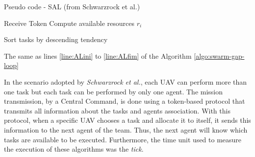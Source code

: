 \begin{algorithm}[h!t]
	\caption{Pseudo code - SAL (from Schwarzrock et al.\cite{MAS07})}
	\label{algo:swarm-gap2}
	
	\SetAlgoLined
	\DontPrintSemicolon
	
	\SetNlSkip{0.3em}
	
	Receive Token\;
	Compute available resources $r_i $ \; \label{line:compute_rALA}
	
	Sort tasks by descending tendency\; \label{line:sortbyTend}
	
	
	The same as lines \ref{line:ALini} to \ref{line:ALfim} of the Algorithm \ref{algo:swarm-gap-loop} \;
	
\end{algorithm}

In the scenario adopted by \textit{Schwarzrock et al.}\cite{MAS07}, each UAV can perform more than one task but each task can be performed by only one agent. The mission transmission, by a Central Command, is done using a token-based protocol that transmits all information about the tasks and agents association. With this protocol, when a specific UAV chooses a task and allocate it to itself, it sends this information to the next agent of the team. Thus, the next agent will know which tasks are available to be executed. Furthermore, the time unit used to measure the execution of these algorithms was the \textit{tick}.